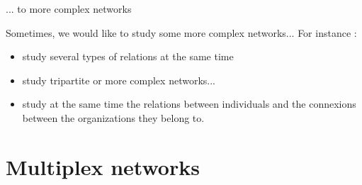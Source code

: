 \documentclass[compress,10pt]{beamer}
\begin{document}
\begin{frame}{... to more complex networks}

Sometimes, we would like to study some more complex networks... 
For instance : 
\begin{itemize}
\item  study several types of relations at the same time
\item study tripartite or more complex networks... 
\item study at the same time the relations between individuals and the connexions between the organizations they belong to. 

\end{itemize}
 

\end{frame}


\section{Multiplex networks}
\end{document}
